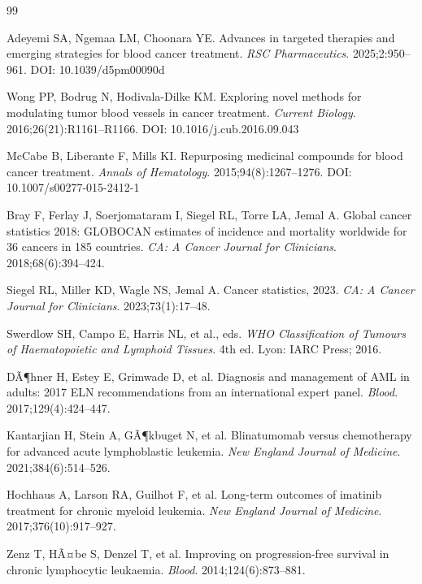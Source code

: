 ﻿\documentclass[12pt,a4paper]{article}
\theoremstyle{definition}
\begin{document}
\begin{thebibliography}{99}

  Adeyemi SA, Ngemaa LM, Choonara YE.
  Advances in targeted therapies and emerging strategies for blood cancer treatment.
  \textit{RSC Pharmaceutics}. 2025;2:950--961.
  \newblock DOI: 10.1039/d5pm00090d

  Wong PP, Bodrug N, Hodivala-Dilke KM.
  Exploring novel methods for modulating tumor blood vessels in cancer treatment.
  \textit{Current Biology}. 2016;26(21):R1161--R1166.
  \newblock DOI: 10.1016/j.cub.2016.09.043

  McCabe B, Liberante F, Mills KI.
  Repurposing medicinal compounds for blood cancer treatment.
  \textit{Annals of Hematology}. 2015;94(8):1267--1276.
  \newblock DOI: 10.1007/s00277-015-2412-1

  Bray F, Ferlay J, Soerjomataram I, Siegel RL, Torre LA, Jemal A.
  Global cancer statistics 2018: GLOBOCAN estimates of incidence and mortality
  worldwide for 36 cancers in 185 countries.
  \textit{CA: A Cancer Journal for Clinicians}. 2018;68(6):394--424.

  Siegel RL, Miller KD, Wagle NS, Jemal A.
  Cancer statistics, 2023.
  \textit{CA: A Cancer Journal for Clinicians}. 2023;73(1):17--48.

  Swerdlow SH, Campo E, Harris NL, et al., eds.
  \textit{WHO Classification of Tumours of Haematopoietic and Lymphoid Tissues}.
  4th ed. Lyon: IARC Press; 2016.

  DÃ¶hner H, Estey E, Grimwade D, et al.
  Diagnosis and management of AML in adults: 2017 ELN recommendations from an
  international expert panel.
  \textit{Blood}. 2017;129(4):424--447.

  Kantarjian H, Stein A, GÃ¶kbuget N, et al.
  Blinatumomab versus chemotherapy for advanced acute lymphoblastic leukemia.
  \textit{New England Journal of Medicine}. 2021;384(6):514--526.

  Hochhaus A, Larson RA, Guilhot F, et al.
  Long-term outcomes of imatinib treatment for chronic myeloid leukemia.
  \textit{New England Journal of Medicine}. 2017;376(10):917--927.

  Zenz T, HÃ¤be S, Denzel T, et al.
  Improving on progression-free survival in chronic lymphocytic leukaemia.
  \textit{Blood}. 2014;124(6):873--881.


\end{thebibliography}
\end{document}
